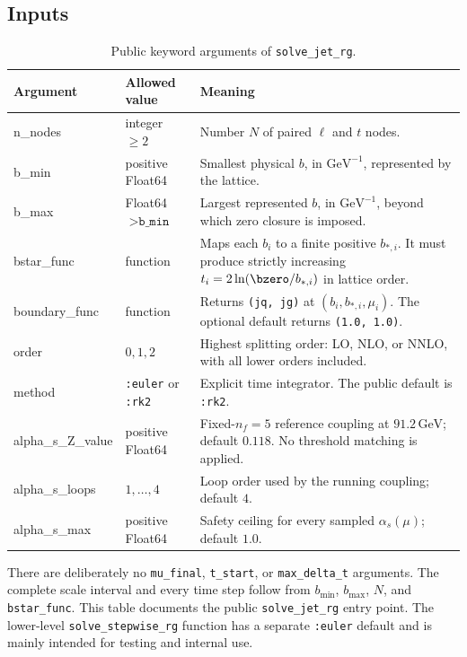 \subsection{Inputs}

\begin{table}[H]
\centering
\caption{Public keyword arguments of \texttt{solve\_jet\_rg}.}
\label{tab:solver-inputs}
\begin{tabularx}{\textwidth}{@{}>{\ttfamily}l >{\raggedright\arraybackslash}p{} X@{}}
\toprule
\textrm{Argument} & \textrm{Allowed value} & \textrm{Meaning}\\
\midrule
n\_nodes
  & integer \(\ge2\)
  & Number \(N\) of paired \(\ell\) and \(t\) nodes.\\
b\_min
  & positive Float64
  & Smallest physical \(b\), in \(\mathrm{GeV}^{-1}\), represented by the
    lattice.\\
b\_max
  & Float64 \(>\texttt{b\_min}\)
  & Largest represented \(b\), in \(\mathrm{GeV}^{-1}\), beyond which zero
    closure is imposed.\\
bstar\_func
  & function
  & Maps each \(b_i\) to a finite positive \(b_{*,i}\). It must produce
    strictly increasing \(t_i=2\ln(\bzero/b_{*,i})\) in lattice order.\\
boundary\_func
  & function
  & Returns \texttt{(jq, jg)} at \((b_i,b_{*,i},\mu_i)\). The optional default
    returns \texttt{(1.0, 1.0)}.\\
order
  & \(0,1,2\)
  & Highest splitting order: LO, NLO, or NNLO, with all lower orders included.\\
method
  & \texttt{:euler} or \texttt{:rk2}
  & Explicit time integrator. The public default is \texttt{:rk2}.\\
alpha\_s\_Z\_value
  & positive Float64
  & Fixed-\(n_f=5\) reference coupling at \(91.2\,\mathrm{GeV}\); default
    \(0.118\). No threshold matching is applied.\\
alpha\_s\_loops
  & \(1,\ldots,4\)
  & Loop order used by the running coupling; default \(4\).\\
alpha\_s\_max
  & positive Float64
  & Safety ceiling for every sampled \(\alpha_s(\mu)\); default \(1.0\).\\
\bottomrule
\end{tabularx}
\end{table}

There are deliberately no \texttt{mu\_final}, \texttt{t\_start}, or
\texttt{max\_delta\_t} arguments. The complete scale interval and every time
step follow from \(b_{\min}\), \(b_{\max}\), \(N\), and \texttt{bstar\_func}.
This table documents the public \texttt{solve\_jet\_rg} entry point. The
lower-level \texttt{solve\_stepwise\_rg} function has a separate
\texttt{:euler} default and is mainly intended for testing and internal use.

